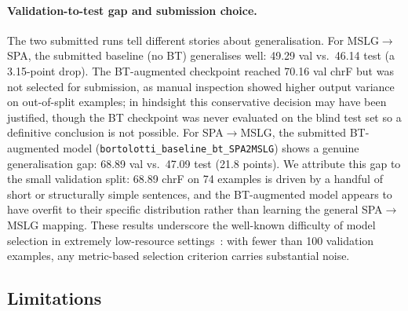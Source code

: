 \documentclass[sigconf,screen]{ceurart}
\begin{document}
\paragraph{Validation-to-test gap and submission choice.}
The two submitted runs tell different stories about generalisation.
For MSLG$\!\to\!$SPA, the submitted baseline (no BT) generalises
well: 49.29 val vs.\ 46.14 test (a 3.15-point drop).
The BT-augmented checkpoint reached 70.16 val chrF but was not
selected for submission, as manual inspection showed higher output
variance on out-of-split examples; in hindsight this conservative decision
may have been justified, though the BT checkpoint was never evaluated
on the blind test set so a definitive conclusion is not possible.
For SPA$\!\to\!$MSLG, the submitted BT-augmented model
(\texttt{bortolotti\_baseline\_bt\_SPA2MSLG}) shows a genuine
generalisation gap: 68.89 val vs.\ 47.09 test (21.8 points).
We attribute this gap to the small validation split: 68.89 chrF on
74 examples is driven by a handful of short or structurally simple
sentences, and the BT-augmented model appears to have overfit to
their specific distribution rather than learning the general
SPA$\!\to\!$MSLG mapping.
These results underscore the well-known difficulty of model selection
in extremely low-resource settings~\cite{sennrich2016bt}: with fewer
than 100 validation examples, any metric-based selection criterion
carries substantial noise.

\subsection{Limitations}
\end{document}
